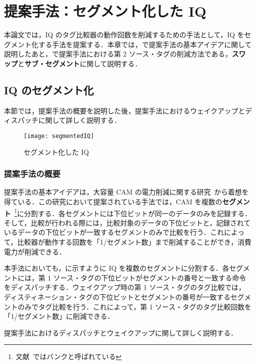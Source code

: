 
\chapter{提案手法：セグメント化した IQ}
\label{sec:segment_IQ}
本論文では，IQ のタグ比較器の動作回数を削減するための手法として，IQ をセグメント化する手法を提案する．本章では，で提案手法の基本アイデアに関して説明したあと，で提案手法における第 2 ソース・タグの削減方法である，\textbf{スワップ}と\textbf{サブ・セグメント}に関して説明する．

\section{IQ のセグメント化}
\label{sec:segmented_IQ}
本節では，提案手法の概要を説明した後，提案手法におけるウェイクアップとディスパッチに関して詳しく説明する．

\begin{figure}[htb]
  \centering
  \texttt{[image: segmentedIQ]}
  \caption{セグメント化した IQ}
  \label{fig:segmentedIQ}
\end{figure}

\subsection{提案手法の概要}
提案手法の基本アイデアは，大容量 CAM の電力削減に関する研究~\cite{Motomura1990paper, Motomura1990journal}から着想を得ている．この研究において提案されている手法では，CAM を複数の\textbf{セグメント}~\footnote{文献~\cite{Motomura1990paper, Motomura1990journal}ではバンクと呼ばれている}に分割する．各セグメントには下位ビットが同一のデータのみを記録する．そして，比較が行われる際には，比較対象のデータの下位ビットと，記録されているデータの下位ビットが一致するセグメントのみで比較を行う．これによって，比較器が動作する回数を「1/セグメント数」まで削減することができ，消費電力が削減できる．

本手法においても，に示すように IQ を複数のセグメントに分割する．各セグメントには，第 1 ソース・タグの下位ビットがセグメントの番号と一致する命令をディスパッチする．ウェイクアップ時の第 1 ソース・タグのタグ比較では，ディスティネーション・タグの下位ビットとセグメントの番号が一致するセグメントのみでタグ比較を行う．これによって，第 1 ソース・タグのタグ比較回数を「1/セグメント数」に削減できる．

提案手法におけるディスパッチとウェイクアップに関して詳しく説明する．

